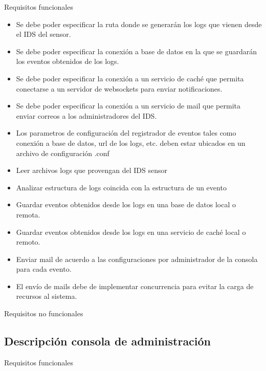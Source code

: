 Requisitos funcionales \\

\begin{itemize}
    \item Se debe poder especificar la ruta donde se generarán los logs que vienen desde el IDS del sensor.
    \item Se debe poder especificar la conexión a base de datos en la que se guardarán los eventos obtenidos de los logs.
    \item Se debe poder especificar la conexión a un servicio de caché que permita conectarse a un servidor de websockets para enviar notificaciones.
    \item Se debe poder especificar la conexión a un servicio de mail que permita enviar correos a los administradores del IDS.
    \item Los parametros de configuración del registrador de eventos tales como conexión a base de datos, url de los logs, etc. deben estar ubicados en un archivo de configuración .conf
    \item Leer archivos logs que provengan del IDS sensor
    \item Analizar estructura de logs coincida con la estructura de un evento
    \item Guardar eventos obtenidos desde los logs en una base de datos local o remota.
    \item Guardar eventos obtenidos desde los logs en una servicio de caché local o remoto.
    \item Enviar mail de acuerdo a las configuraciones por administrador de la consola para cada evento.
    \item El envío de mails debe de implementar concurrencia para evitar la carga de recursos al sistema.
\end{itemize}

Requisitos no funcionales \\

%

\subsection{Descripción consola de administración}

Requisitos funcionales \\

